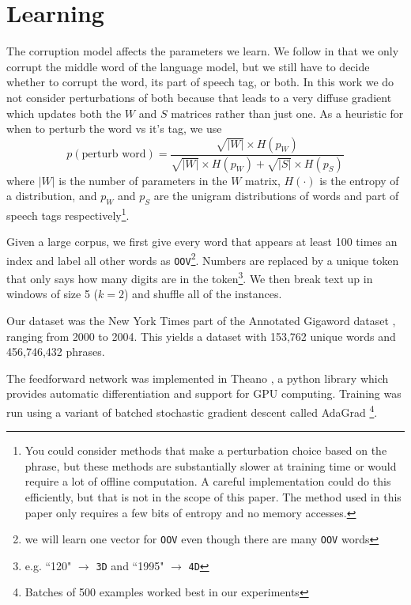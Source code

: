\documentclass[11pt,letterpaper]{article}
\begin{document}
\section{Learning} %
The corruption model affects the parameters we learn.
We follow \cite{rami} in that we only corrupt the middle word of the language model,
but we still have to decide whether to corrupt the word, its part of speech tag, or both.
In this work we do not consider perturbations of both because that leads to a very
diffuse gradient which updates both the $W$ and $S$ matrices rather than just one.
As a heuristic for when to perturb the word vs it's tag, we use
\[
	p(\mbox{perturb word}) = \frac
		{\sqrt{|W|} \times H(p_W)}
	{\sqrt{|W|} \times H(p_W) + \sqrt{|S|} \times H(p_S)}
\]
where $|W|$ is the number of parameters in the $W$ matrix, $H(\cdot)$ is
the entropy of a distribution, and $p_W$ and $p_S$ are the unigram distributions
of words and part of speech tags respectively\footnote{You could consider methods
that make a perturbation choice based on the phrase, but these methods are
substantially slower at training time or would require a lot of offline computation.
A careful implementation could do this efficiently, but that is not in the scope of this paper.
The method used in this paper only requires a few bits of entropy and no memory accesses.}.



Given a large corpus, we first give every word that appears at least 100
times an index and label all other words as \texttt{OOV}\footnote{we will learn
one vector for \texttt{OOV} even though there are many \texttt{OOV} words}.
Numbers are replaced by a unique token that only says how many digits are in
the token\footnote{e.g. ``120" $\rightarrow$ \texttt{3D} and ``1995" $\rightarrow$ \texttt{4D}}.
We then break text up in windows of size 5 ($k=2$) and shuffle all of the instances.

Our dataset was the New York Times part of the Annotated Gigaword dataset \cite{agiga},
ranging from 2000 to 2004. This yields a dataset with 153,762 unique words and 
456,746,432 phrases.

The feedforward network was implemented in Theano \cite{theano},
a python library which provides automatic differentiation and support for GPU computing.
Training was run using a variant of batched stochastic gradient descent called AdaGrad \cite{adagrad}
\footnote{Batches of 500 examples worked best in our experiments}.
\end{document}
